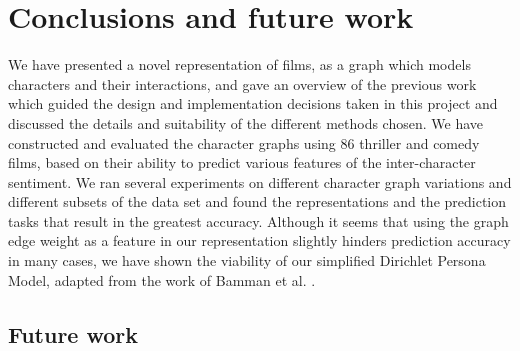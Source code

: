 \documentclass[bsc,frontabs,singlespacing,parskip, twoside]{infthesis}
\begin{document}
\chapter{Conclusions and future work}

We have presented a novel representation of films, as a graph which models characters and their interactions, and gave an overview of the previous work which guided the design and implementation decisions taken in this project and discussed the details and suitability of the different methods chosen. We have constructed and evaluated the character graphs using 86 thriller and comedy films, based on their ability to predict various features of the inter-character sentiment. We ran several experiments on different character graph variations and different subsets of the data set and found the representations and the prediction tasks that result in the greatest accuracy. Although it seems that using the graph edge weight as a feature in our representation slightly hinders prediction accuracy in many cases, we have shown the viability of our simplified Dirichlet Persona Model, adapted from the work of Bamman et al. \cite{Bamman2013}.

\section{Future work}
\end{document}
